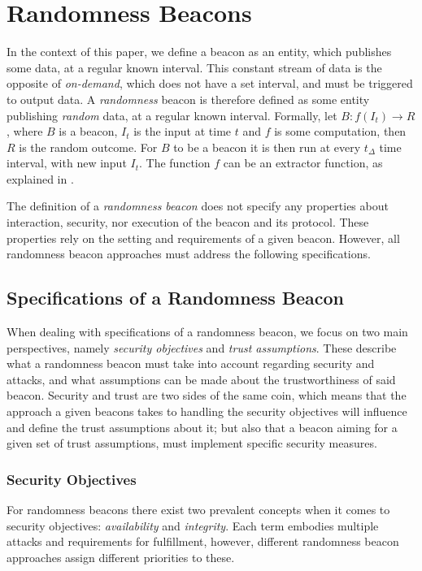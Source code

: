 \section{Randomness Beacons}
In the context of this paper, we define a beacon as an entity, which publishes some data, at a regular known interval.
This constant stream of data is the opposite of \emph{on-demand}, which does not have a set interval, and must be triggered to output data.
A \emph{randomness} beacon is therefore defined as some entity publishing \emph{random} data, at a regular known interval.
Formally, let $B: f(I_t) \rightarrow R$, where $B$ is a beacon, $I_t$ is the input at time $t$ and $f$ is some computation, then $R$ is the random outcome.
For $B$ to be a beacon it is then run at every $t_\Delta$ time interval, with new input $I_t$.
The function $f$ can be an extractor function, %
as explained in .

The definition of a \emph{randomness beacon} does not specify any properties about interaction, security, nor execution of the beacon and its protocol.
These properties rely on the setting and requirements of a given beacon.
However, all randomness beacon approaches must address the following specifications.

\subsection{Specifications of a Randomness Beacon}
When dealing with specifications of a randomness beacon, we focus on two main perspectives, namely \emph{security objectives} and \emph{trust assumptions}.
These describe what a randomness beacon must take into account regarding security and attacks, and what assumptions can be made about the trustworthiness of said beacon.
Security and trust are two sides of the same coin, which means that the approach a given beacons takes to handling the security objectives will influence and define the trust assumptions about it;
but also that a beacon aiming for a given set of trust assumptions, must implement specific security measures.
\subsubsection{Security Objectives}\label{ssub:security_objectives}
For randomness beacons there exist two prevalent concepts when it comes to security objectives: \emph{availability} and \emph{integrity}.
Each term embodies multiple attacks and requirements for fulfillment, however, different randomness beacon approaches assign different priorities to these.

